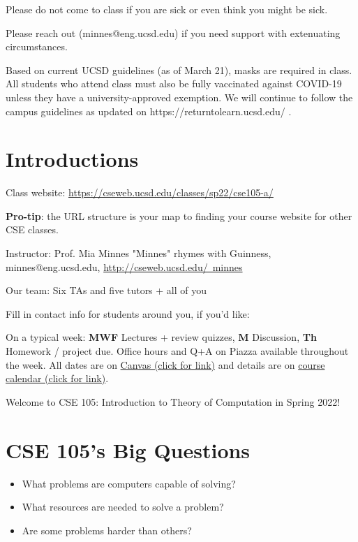 Please do not come to class if you are sick or even think you might be sick.

Please reach out (minnes@eng.ucsd.edu) if you need support with extenuating circumstances.

Based on current UCSD guidelines (as of March 21), masks are required in class. 
All students who attend class must also be fully vaccinated against COVID-19
unless they have a university-approved exemption.
We will continue to follow the campus guidelines as updated on https://returntolearn.ucsd.edu/ .


\newpage

\section*{Introductions}
Class website: \href{https://cseweb.ucsd.edu/classes/sp22/cse105-a/}{https://cseweb.ucsd.edu/classes/sp22/cse105-a/}

{\bf Pro-tip}: the URL structure is your map to finding your course website for other CSE classes.

Instructor: Prof. Mia Minnes {\tiny{"Minnes" rhymes with Guinness}}, minnes@eng.ucsd.edu, 
\href{http://cseweb.ucsd.edu/~minnes}{http://cseweb.ucsd.edu/~minnes}

Our team: Six TAs and five tutors + all of you

Fill in contact info for students around you, if you'd like:

\vfill


On a typical week: {\bf MWF} Lectures + review quizzes, {\bf M} Discussion, {\bf Th} Homework / project due.
Office hours and Q+A on Piazza available throughout the week.
All dates are on \href{https://canvas.ucsd.edu/}{Canvas (click for link)} and details are on
 \href{https://theory-cs.github.io/website/overview_calendar.html}{course calendar (click for link)}.

\newpage Welcome to CSE 105: Introduction to Theory of Computation in Spring 2022!

\section*{CSE 105's Big Questions}
\begin{itemize}
   \item What problems are computers capable of solving?
   \item What resources are needed to solve a problem?
   \item Are some problems harder than others?
\end{itemize}

